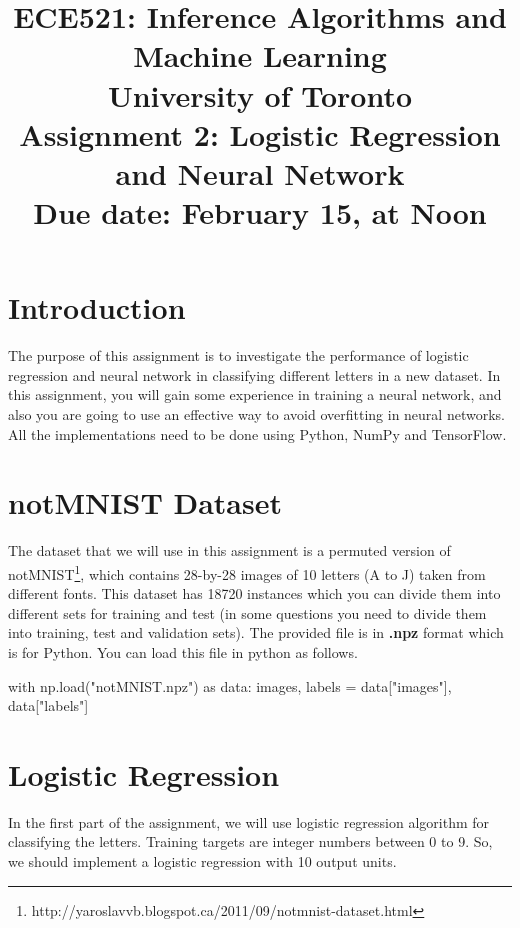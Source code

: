 \documentclass[12pt]{article}
\title{\Large{ECE521: Inference Algorithms and Machine Learning \\ University of Toronto \\Assignment 2: Logistic Regression and Neural Network\\Due date: February 15, at Noon}}
\date{}
\begin{document}
\maketitle

\section{Introduction}

The purpose of this assignment is to investigate the performance of logistic regression and neural network in classifying different letters in a new dataset. In this assignment, you will gain some experience in training a neural network, and also you are going to use an effective way to avoid overfitting in neural networks. All the implementations need to be done using Python, NumPy and TensorFlow.



\section{notMNIST Dataset}

The dataset that we will use in this assignment is a permuted version of notMNIST\footnote{http://yaroslavvb.blogspot.ca/2011/09/notmnist-dataset.html}, which contains 28-by-28 images of 10 letters (A to J) taken from different fonts. This dataset has 18720 instances which you can divide them into different sets for training and test (in some questions you need to divide them into training, test and validation sets). The provided file is in \textbf{.npz} format which is for Python. You can load this file in python as follows.

\begin{python}
with np.load("notMNIST.npz") as data:
    images, labels = data["images"], data["labels"]
\end{python}



\section{Logistic Regression}

In the first part of the assignment, we will use logistic regression algorithm for classifying the letters. Training targets are integer numbers between 0 to 9. So, we should implement a logistic regression with 10 output units.
\end{document}
